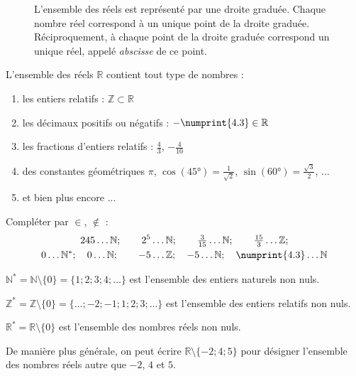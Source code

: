\begin{figure}[hb]
	\caption{L'ensemble des réels est représenté par une droite graduée. Chaque nombre réel correspond à un unique point de la droite graduée.   Réciproquement, à chaque point de la droite graduée correspond un unique réel, appelé \emph{abscisse} de ce point.}
	\label{fig:droitereels}
\end{figure} 
L'ensemble des réels $\mathbb{R}$ contient tout type de nombres :
\begin{enumerate}[label=\alph*),leftmargin=*]
	\item les entiers relatifs : $\mathbb{Z}\subset \mathbb{R}$
	\item les décimaux positifs ou négatifs : $-\numprint{4.3}\in \mathbb{R}$ 
	\item les fractions d'entiers relatifs : $\tfrac{4}{3}$,  $-\tfrac{4}{10}$
	\item des constantes géométriques $\pi$, $\cos(\ang{45})=\tfrac{1}{\sqrt{2}}$, $\sin(\ang{60})=\tfrac{\sqrt{3}}{2}$,  ...
	\item et bien plus encore ...
\end{enumerate} 
\begin{exerciseT}Compléter par $\in$, $\notin$ : 
	\begin{gather*}
		245 \ldots \mathbb{N} ;\qquad  2^5 \ldots \mathbb{N} ;\qquad \tfrac{3}{15} \ldots\mathbb{N}; \qquad \tfrac{15}{3} \ldots \mathbb{Z}; \\
		0 \ldots\mathbb{N}^*; \quad    0 \ldots\mathbb{N}; \qquad -5\ldots \mathbb{Z};\quad -5 \ldots \mathbb{N} ; \quad \numprint{4.3}\ldots \mathbb{N} 
	\end{gather*} 
\end{exerciseT} 
\begin{definition} \hfill 
	
	$\mathbb{N}^*=\mathbb{N}\setminus\{0\}=\{1;2;3;4;\dots\}$  est l'ensemble des entiers naturels non nuls.
	
	$\mathbb{Z}^*=\mathbb{Z}\setminus\{0\}=\{\dots;-2;-1;1;2;3;\dots\}$  est l'ensemble des entiers relatifs non nuls.
	
	$\mathbb{R}^*=\mathbb{R}\setminus\{0\}$ est l'ensemble des nombres réels non nuls.
\end{definition}
De manière plus générale, on peut écrire $\mathbb{R}\setminus\{-2; 4; 5\}$ pour désigner l'ensemble des nombres réels autre que $-2$, $4$ et $5$. 

%	 
